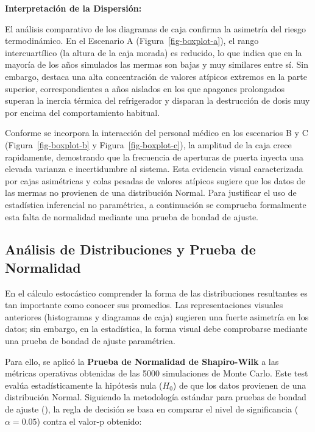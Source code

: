 \documentclass[
  spanish,
  us-letterpaper,
]{scrreprt}
\numberwithin{equation}{section}
\theoremstyle{plain}
\theoremstyle{plain}
\theoremstyle{definition}
\theoremstyle{plain}
\theoremstyle{remark}
\begin{document}
\textbf{Interpretación de la Dispersión:}

El análisis comparativo de los diagramas de caja confirma la asimetría
del riesgo termodinámico. En el Escenario A
(Figura~\ref{fig-boxplot-a}), el rango intercuartílico (la altura de la
caja morada) es reducido, lo que indica que en la mayoría de los años
simulados las mermas son bajas y muy similares entre sí. Sin embargo,
destaca una alta concentración de valores atípicos extremos en la parte
superior, correspondientes a años aislados en los que apagones
prolongados superan la inercia térmica del refrigerador y disparan la
destrucción de dosis muy por encima del comportamiento habitual.

Conforme se incorpora la interacción del personal médico en los
escenarios B y C (Figura~\ref{fig-boxplot-b} y
Figura~\ref{fig-boxplot-c}), la amplitud de la caja crece rapidamente,
demostrando que la frecuencia de aperturas de puerta inyecta una elevada
varianza e incertidumbre al sistema. Esta evidencia visual caracterizada
por cajas asimétricas y colas pesadas de valores atípicos sugiere que
los datos de las mermas no provienen de una distribución Normal. Para
justificar el uso de estadística inferencial no paramétrica, a
continuación se comprueba formalmente esta falta de normalidad mediante
una prueba de bondad de ajuste.

\subsection{Análisis de Distribuciones y Prueba de
Normalidad}\label{anuxe1lisis-de-distribuciones-y-prueba-de-normalidad}

En el cálculo estocástico comprender la forma de las distribuciones
resultantes es tan importante como conocer sus promedios. Las
representaciones visuales anteriores (histogramas y diagramas de caja)
sugieren una fuerte asimetría en los datos; sin embargo, en la
estadística, la forma visual debe comprobarse mediante una prueba de
bondad de ajuste paramétrica.

Para ello, se aplicó la \textbf{Prueba de Normalidad de Shapiro-Wilk} a
las métricas operativas obtenidas de las 5000 simulaciones de Monte
Carlo. Este test evalúa estadísticamente la hipótesis nula (\(H_0\)) de
que los datos provienen de una distribución Normal. Siguiendo la
metodología estándar para pruebas de bondad de ajuste
(), la
regla de decisión se basa en comparar el nivel de significancia
(\(\alpha = 0.05\)) contra el valor-p obtenido:
\end{document}

